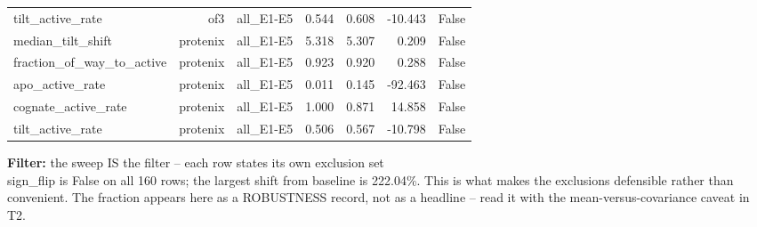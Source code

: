 \begin{longtable}{lrrrrrr}
tilt\_active\_rate & of3 & all\_E1-E5 & 0.544 & 0.608 & -10.443 & False \\
median\_tilt\_shift & protenix & all\_E1-E5 & 5.318 & 5.307 & 0.209 & False \\
fraction\_of\_way\_to\_active & protenix & all\_E1-E5 & 0.923 & 0.920 & 0.288 & False \\
apo\_active\_rate & protenix & all\_E1-E5 & 0.011 & 0.145 & -92.463 & False \\
cognate\_active\_rate & protenix & all\_E1-E5 & 1.000 & 0.871 & 14.858 & False \\
tilt\_active\_rate & protenix & all\_E1-E5 & 0.506 & 0.567 & -10.798 & False \\
\end{longtable}
\begin{flushleft}\scriptsize
\textbf{Filter:} the sweep IS the filter -- each row states its own exclusion set
 \\ sign\_flip is False on all 160 rows; the largest shift from baseline is 222.04\%. This is what makes the exclusions defensible rather than convenient. The fraction appears here as a ROBUSTNESS record, not as a headline -- read it with the mean-versus-covariance caveat in T2.
\end{flushleft}
\endgroup
